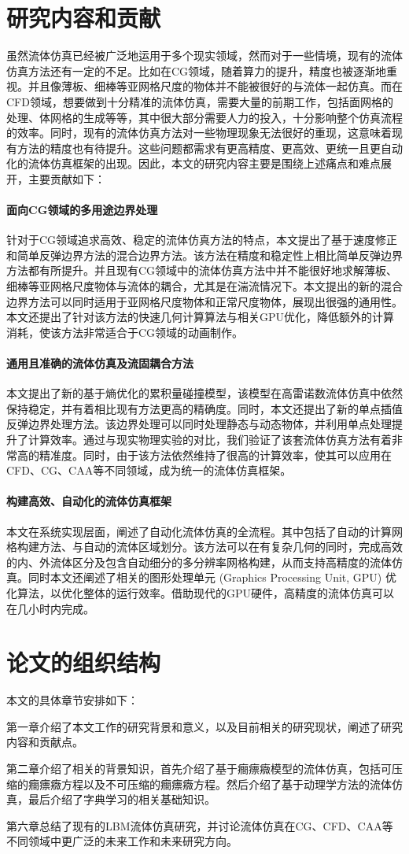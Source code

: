 \section{研究内容和贡献}
虽然流体仿真已经被广泛地运用于多个现实领域，然而对于一些情境，现有的流体仿真方法还有一定的不足。比如在CG领域，随着算力的提升，精度也被逐渐地重视。并且像薄板、细棒等亚网格尺度的物体并不能被很好的与流体一起仿真。而在CFD领域，想要做到十分精准的流体仿真，需要大量的前期工作，包括面网格的处理、体网格的生成等等，其中很大部分需要人力的投入，十分影响整个仿真流程的效率。同时，现有的流体仿真方法对一些物理现象无法很好的重现，这意味着现有方法的精度也有待提升。这些问题都需求有更高精度、更高效、更统一且更自动化的流体仿真框架的出现。因此，本文的研究内容主要是围绕上述痛点和难点展开，主要贡献如下：

\paragraph{面向CG领域的多用途边界处理}
针对于CG领域追求高效、稳定的流体仿真方法的特点，本文提出了基于速度修正和简单反弹边界方法的混合边界方法。该方法在精度和稳定性上相比简单反弹边界方法都有所提升。并且现有CG领域中的流体仿真方法中并不能很好地求解薄板、细棒等亚网格尺度物体与流体的耦合，尤其是在湍流情况下。本文提出的新的混合边界方法可以同时适用于亚网格尺度物体和正常尺度物体，展现出很强的通用性。本文还提出了针对该方法的快速几何计算算法与相关GPU优化，降低额外的计算消耗，使该方法非常适合于CG领域的动画制作。

\paragraph{通用且准确的流体仿真及流固耦合方法}
本文提出了新的基于熵优化的累积量碰撞模型，该模型在高雷诺数流体仿真中依然保持稳定，并有着相比现有方法更高的精确度。同时，本文还提出了新的单点插值反弹边界处理方法。该边界处理可以同时处理静态与动态物体，并利用单点处理提升了计算效率。通过与现实物理实验的对比，我们验证了该套流体仿真方法有着非常高的精准度。同时，由于该方法依然维持了很高的计算效率，使其可以应用在CFD、CG、CAA等不同领域，成为统一的流体仿真框架。

\paragraph{构建高效、自动化的流体仿真框架}
本文在系统实现层面，阐述了自动化流体仿真的全流程。其中包括了自动的计算网格构建方法、与自动的流体区域划分。该方法可以在有复杂几何的同时，完成高效的内、外流体区分及包含自动细分的多分辨率网格构建，从而支持高精度的流体仿真。同时本文还阐述了相关的图形处理单元 (Graphics Processing Unit, GPU) 优化算法，以优化整体的运行效率。借助现代的GPU硬件，高精度的流体仿真可以在几小时内完成。


\section{论文的组织结构}
本文的具体章节安排如下：

第一章介绍了本文工作的研究背景和意义，以及目前相关的研究现状，阐述了研究内容和贡献点。

第二章介绍了相关的背景知识，首先介绍了基于癎瘭癓模型的流体仿真，包括可压缩的癎瘭癓方程以及不可压缩的癎瘭癓方程。然后介绍了基于动理学方法的流体仿真，最后介绍了字典学习的相关基础知识。

第六章总结了现有的LBM流体仿真研究，并讨论流体仿真在CG、CFD、CAA等不同领域中更广泛的未来工作和未来研究方向。